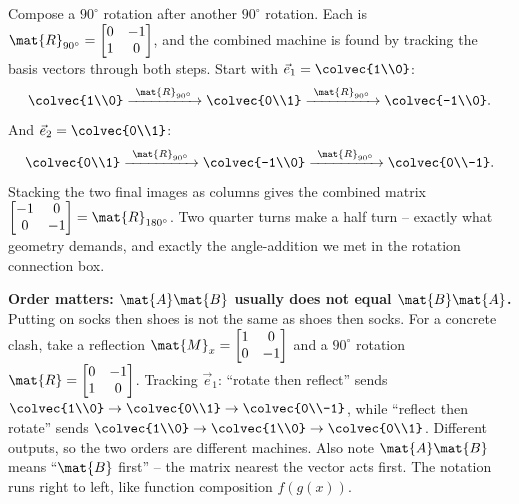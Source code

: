 \begin{example}
\label{ch05:compose-rot}
Compose a $90^\circ$ rotation after another $90^\circ$ rotation. Each is
$\mat{R}_{90^\circ} = \begin{bmatrix} 0 & -1 \\ 1 & 0\end{bmatrix}$, and the
combined machine is found by tracking the basis vectors through both steps. Start
with $\vec{e}_1 = \colvec{1\\0}$:
\[
  \colvec{1\\0}
  \xrightarrow{\ \mat{R}_{90^\circ}\ } \colvec{0\\1}
  \xrightarrow{\ \mat{R}_{90^\circ}\ } \colvec{-1\\0}.
\]
And $\vec{e}_2 = \colvec{0\\1}$:
\[
  \colvec{0\\1}
  \xrightarrow{\ \mat{R}_{90^\circ}\ } \colvec{-1\\0}
  \xrightarrow{\ \mat{R}_{90^\circ}\ } \colvec{0\\-1}.
\]
Stacking the two final images as columns gives the combined matrix
$\begin{bmatrix} -1 & 0 \\ 0 & -1\end{bmatrix} = \mat{R}_{180^\circ}$. Two quarter
turns make a half turn -- exactly what geometry demands, and exactly the
angle-addition we met in the rotation connection box.
\end{example}

\begin{trapbox}
\textbf{Order matters: $\mat{A}\mat{B}$ usually does not equal $\mat{B}\mat{A}$.}
Putting on socks then shoes is not the same as shoes then socks. For a concrete
clash, take a reflection $\mat{M}_x = \begin{bmatrix}1&0\\0&-1\end{bmatrix}$ and a
$90^\circ$ rotation $\mat{R} = \begin{bmatrix}0&-1\\1&0\end{bmatrix}$. Tracking
$\vec{e}_1$: ``rotate then reflect'' sends $\colvec{1\\0}\to\colvec{0\\1}\to
\colvec{0\\-1}$, while ``reflect then rotate'' sends $\colvec{1\\0}\to\colvec{1\\0}
\to\colvec{0\\1}$. Different outputs, so the two orders are different machines.
Also note $\mat{A}\mat{B}$ means ``$\mat{B}$ first'' -- the matrix nearest the
vector acts first. The notation runs right to left, like function composition
$f(g(x))$.
\end{trapbox}

